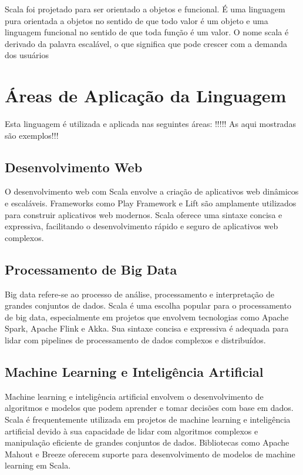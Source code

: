 Scala foi projetado para ser orientado a objetos e funcional. É uma linguagem pura orientada a objetos no sentido de que todo valor é um objeto e uma linguagem funcional no sentido de que toda função é um valor. O nome scala é derivado da palavra escalável, o que significa que pode crescer com a demanda dos usuários


   \section{\'{A}reas de Aplica\c{c}\~{a}o da Linguagem}
   Esta linguagem \'{e} utilizada e aplicada nas seguintes \'{a}reas: !!!!! As aqui mostradas s\~{a}o exemplos!!!

\subsection{Desenvolvimento Web}

O desenvolvimento web com Scala envolve a criação de aplicativos web dinâmicos e escaláveis. Frameworks como Play Framework e Lift são amplamente utilizados para construir aplicativos web modernos. Scala oferece uma sintaxe concisa e expressiva, facilitando o desenvolvimento rápido e seguro de aplicativos web complexos.

\subsection{Processamento de Big Data}

Big data refere-se ao processo de análise, processamento e interpretação de grandes conjuntos de dados. Scala é uma escolha popular para o processamento de big data, especialmente em projetos que envolvem tecnologias como Apache Spark, Apache Flink e Akka. Sua sintaxe concisa e expressiva é adequada para lidar com pipelines de processamento de dados complexos e distribuídos.

\subsection{Machine Learning e Inteligência Artificial}

Machine learning e inteligência artificial envolvem o desenvolvimento de algoritmos e modelos que podem aprender e tomar decisões com base em dados. Scala é frequentemente utilizada em projetos de machine learning e inteligência artificial devido à sua capacidade de lidar com algoritmos complexos e manipulação eficiente de grandes conjuntos de dados. Bibliotecas como Apache Mahout e Breeze oferecem suporte para desenvolvimento de modelos de machine learning em Scala.

